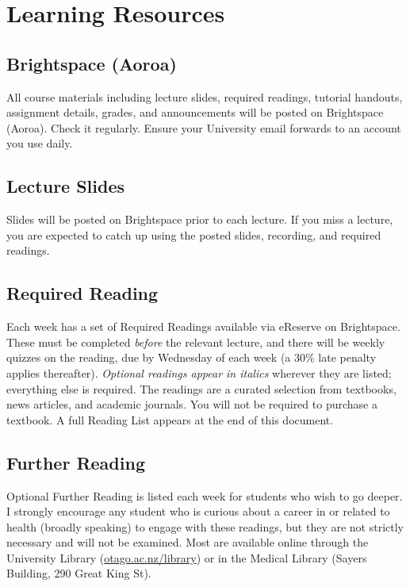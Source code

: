 \documentclass[11pt, a4paper]{article}
\begin{document}
\section{Learning Resources}

\subsection{Brightspace (Aoroa)}
All course materials including lecture slides, required readings, tutorial handouts, assignment details, grades, and announcements will be posted on Brightspace (Aoroa). Check it regularly. Ensure your University email forwards to an account you use daily.

\subsection{Lecture Slides}
Slides will be posted on Brightspace prior to each lecture. If you miss a lecture, you are expected to catch up using the posted slides, recording, and required readings.

\subsection{Required Reading}
Each week has a set of Required Readings available via eReserve on Brightspace. These must be completed \emph{before} the relevant lecture, and there will be weekly quizzes on the reading, due by Wednesday of each week (a 30\% late penalty applies thereafter). \emph{Optional readings appear in italics} wherever they are listed; everything else is required. The readings are a curated selection from textbooks, news articles, and academic journals. You will not be required to purchase a textbook. A full Reading List appears at the end of this document.

\subsection{Further Reading}
Optional Further Reading is listed each week for students who wish to go deeper. I strongly encourage any student who is curious about a career in or related to health (broadly speaking) to engage with these readings, but they are not strictly necessary and will not be examined. Most are available online through the University Library (\url{otago.ac.nz/library}) or in the Medical Library (Sayers Building, 290 Great King St).
\end{document}
